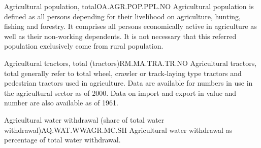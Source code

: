 \begin{Indicators}

\begin{metadata}{Agricultural population, total}{OA.AGR.POP.PPL.NO}
Agricultural population is defined as all persons depending for their livelihood on agriculture, hunting, fishing and forestry. It comprises all persons economically active in agriculture as well as their non-working dependents. It is not necessary that this referred population exclusively come from rural population.
\end{metadata}

\begin{metadata}{Agricultural tractors, total (tractors)}{RM.MA.TRA.TR.NO}
Agricultural tractors, total generally refer to total wheel, crawler or track-laying type tractors and pedestrian tractors used in agriculture. Data are available for numbers in use in the agricultural sector as of 2000. Data on import and export in value and number are also available as of 1961. 
\end{metadata}

\begin{metadata}{Agricultural water withdrawal (share of total water withdrawal)}{AQ.WAT.WWAGR.MC.SH}
Agricultural water withdrawal as percentage of total water withdrawal.
\end{metadata}

\end{Indicators}